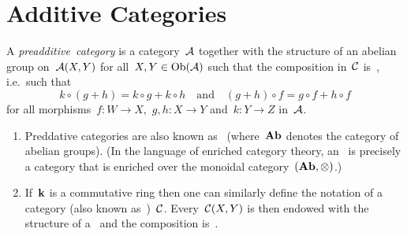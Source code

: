 \section{Additive Categories}


\begin{definition}
  A \emph{preadditive~category} is a category~$\mathcal{A}$ together with the structure of an abelian group on~$\mathcal{A}(X,Y)$ for all~$X, Y \in \operatorname{Ob}(\mathcal{A})$ such that the composition in~$\mathcal{C}$ is~{\Zbilin}, i.e.\ such that
  \[
    k \circ (g + h) = k \circ g + k \circ h
    \quad\text{and}\quad
    (g + h) \circ f = g \circ f + h \circ f
  \]
  for all morphisms~$f \colon W \to X$,~$g, h \colon X \to Y$ and~$k \colon Y \to Z$ in~$\mathcal{A}$.
\end{definition}


\begin{remark}
  \leavevmode
  \begin{enumerate}
    \item
      Preddative categories are also known as~ (where~$\mathbf{Ab}$ denotes the category of abelian groups).
      (In the language of enriched category theory, an~ is precisely a category that is enriched over the monoidal category~$(\mathbf{Ab},{\otimes})$.)
    \item
      If~$\kf$ is a commutative ring then one can similarly define the notation of a {\preklin} category (also known as~)~$\mathcal{C}$.
      Every~$\mathcal{C}(X,Y)$ is then endowed with the structure of a~{\module{$\kf$}} and the composition is~{\kbilin}.
  \end{enumerate}
\end{remark}


